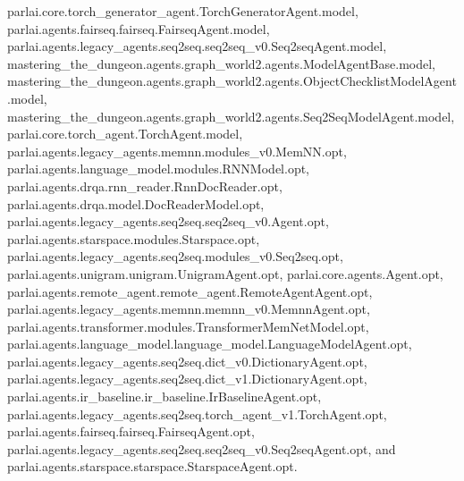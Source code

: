 parlai.\+core.\+torch\+\_\+generator\+\_\+agent.\+Torch\+Generator\+Agent.\+model, parlai.\+agents.\+fairseq.\+fairseq.\+Fairseq\+Agent.\+model, parlai.\+agents.\+legacy\+\_\+agents.\+seq2seq.\+seq2seq\+\_\+v0.\+Seq2seq\+Agent.\+model, mastering\+\_\+the\+\_\+dungeon.\+agents.\+graph\+\_\+world2.\+agents.\+Model\+Agent\+Base.\+model, mastering\+\_\+the\+\_\+dungeon.\+agents.\+graph\+\_\+world2.\+agents.\+Object\+Checklist\+Model\+Agent.\+model, mastering\+\_\+the\+\_\+dungeon.\+agents.\+graph\+\_\+world2.\+agents.\+Seq2\+Seq\+Model\+Agent.\+model, parlai.\+core.\+torch\+\_\+agent.\+Torch\+Agent.\+model, parlai.\+agents.\+legacy\+\_\+agents.\+memnn.\+modules\+\_\+v0.\+Mem\+N\+N.\+opt, parlai.\+agents.\+language\+\_\+model.\+modules.\+R\+N\+N\+Model.\+opt, parlai.\+agents.\+drqa.\+rnn\+\_\+reader.\+Rnn\+Doc\+Reader.\+opt, parlai.\+agents.\+drqa.\+model.\+Doc\+Reader\+Model.\+opt, parlai.\+agents.\+legacy\+\_\+agents.\+seq2seq.\+seq2seq\+\_\+v0.\+Agent.\+opt, parlai.\+agents.\+starspace.\+modules.\+Starspace.\+opt, parlai.\+agents.\+legacy\+\_\+agents.\+seq2seq.\+modules\+\_\+v0.\+Seq2seq.\+opt, parlai.\+agents.\+unigram.\+unigram.\+Unigram\+Agent.\+opt, parlai.\+core.\+agents.\+Agent.\+opt, parlai.\+agents.\+remote\+\_\+agent.\+remote\+\_\+agent.\+Remote\+Agent\+Agent.\+opt, parlai.\+agents.\+legacy\+\_\+agents.\+memnn.\+memnn\+\_\+v0.\+Memnn\+Agent.\+opt, parlai.\+agents.\+transformer.\+modules.\+Transformer\+Mem\+Net\+Model.\+opt, parlai.\+agents.\+language\+\_\+model.\+language\+\_\+model.\+Language\+Model\+Agent.\+opt, parlai.\+agents.\+legacy\+\_\+agents.\+seq2seq.\+dict\+\_\+v0.\+Dictionary\+Agent.\+opt, parlai.\+agents.\+legacy\+\_\+agents.\+seq2seq.\+dict\+\_\+v1.\+Dictionary\+Agent.\+opt, parlai.\+agents.\+ir\+\_\+baseline.\+ir\+\_\+baseline.\+Ir\+Baseline\+Agent.\+opt, parlai.\+agents.\+legacy\+\_\+agents.\+seq2seq.\+torch\+\_\+agent\+\_\+v1.\+Torch\+Agent.\+opt, parlai.\+agents.\+fairseq.\+fairseq.\+Fairseq\+Agent.\+opt, parlai.\+agents.\+legacy\+\_\+agents.\+seq2seq.\+seq2seq\+\_\+v0.\+Seq2seq\+Agent.\+opt, and parlai.\+agents.\+starspace.\+starspace.\+Starspace\+Agent.\+opt.

\mbox{\label{classtransresnet_1_1transresnet_1_1TransresnetAgent_a1a1e5d359d0c7dadfb6eb67a5db686b5}} 

